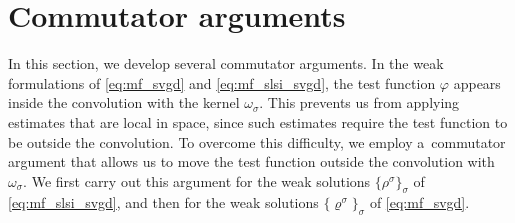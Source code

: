 \documentclass[reqno, 11pt]{amsart}
\numberwithin{equation}{section}
\theoremstyle{definition}
\begin{document}

\section{Commutator arguments}
\label{sec:comm}
In this section, we develop several commutator arguments. In the weak formulations of \eqref{eq:mf_svgd} and \eqref{eq:mf_slsi_svgd}, the test function $\varphi$ appears inside the convolution with the kernel $\omega_\sigma$. This prevents us from applying estimates that are local in space, since such estimates require the test function to be outside the convolution. To overcome this difficulty, we employ a~commutator argument that allows us to move the test function outside the convolution with $\omega_\sigma$. We first carry out this argument for the weak solutions $\{\rho^\sigma\}_\sigma$ of \eqref{eq:mf_slsi_svgd}, and then for the weak solutions $\{\varrho^\sigma\}_\sigma$ of \eqref{eq:mf_svgd}.
\end{document}

